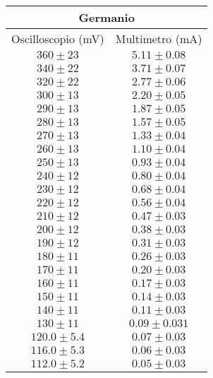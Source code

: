 \documentclass[@MAIN@]{subfile}
\begin{document}
\begin{tabular}{ ||c|c|| }
  \hline
  \multicolumn{2}{||c||}{Germanio}\\
  \hline
  Oscilloscopio (mV) & Multimetro (mA)\\
  \hline
  $360\pm 23$ & $5.11\pm 0.08$ \\
  \hline
  $340\pm 22$ & $3.71\pm 0.07$ \\
  \hline
  $320\pm 22$ & $2.77\pm 0.06$ \\
  \hline
  $300\pm 13$ & $2.20\pm 0.05$\\
  \hline
  $290\pm 13$ & $1.87\pm 0.05$ \\
  \hline
  $280\pm 13$ & $1.57\pm 0.05$ \\
  \hline
  $270\pm 13$ & $1.33\pm 0.04$ \\
  \hline
  $260\pm 13$ & $1.10\pm 0.04$ \\
  \hline
  $250\pm 13$ & $0.93\pm 0.04$ \\
  \hline
  $240\pm 12$ & $0.80\pm 0.04$ \\
  \hline
  $230\pm 12$ & $0.68\pm 0.04$ \\
  \hline 
  $220\pm 12$ & $0.56\pm 0.04$ \\
  \hline 
  $210\pm 12$ & $0.47\pm 0.03$ \\
  \hline 
  $200\pm 12$ & $0.38\pm 0.03$ \\
  \hline 
  $190\pm 12$ & $0.31\pm 0.03$ \\
  \hline 
  $180\pm 11$ & $0.26\pm 0.03$ \\
  \hline 
  $170\pm 11$ & $0.20\pm 0.03$ \\
  \hline 
  $160\pm 11$ & $0.17\pm 0.03$ \\
  \hline 
  $150\pm 11$ & $0.14\pm 0.03$ \\
  \hline 
  $140\pm 11$ & $0.11\pm 0.03$ \\
  \hline 
  $130\pm 11$ & $0.09\pm 0.031$ \\
  \hline 
  $120.0\pm 5.4$ & $0.07\pm 0.03$ \\
  \hline 
  $116.0\pm 5.3$ & $0.06\pm 0.03$ \\
  \hline 
  $112.0\pm 5.2$ & $0.05\pm 0.03$ \\
  \hline 
 
\end{tabular}   
 
\end{document}
